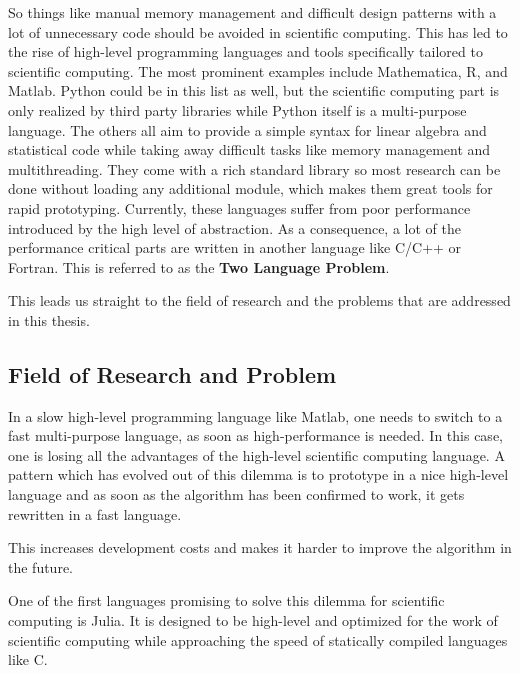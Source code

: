 So things like manual memory management and difficult design patterns with a lot of unnecessary code should be avoided in scientific computing.
This has led to the rise of high-level programming languages and tools specifically tailored to scientific computing\cite{DBLP:journals/corr/abs-1209-5145}.
The most prominent examples include Mathematica, R, and Matlab. 
Python could be in this list as well, but the scientific computing part is only realized by third party libraries while Python itself is a multi-purpose language.
The others all aim to provide a simple syntax for linear algebra and statistical code while taking away difficult tasks like memory management and multithreading. 
They come with a rich standard library so most research can be done without loading any additional module, which makes them great tools for rapid prototyping.
Currently, these languages suffer from poor performance introduced by the high level of abstraction.
As a consequence, a lot of the performance critical parts are written in another language like C/C++ or Fortran.
This is referred to as the \textbf{Two Language Problem}\cite{ArrayMultiJeff}.

This leads us straight to the field of research and the problems that are addressed in this thesis.


\subsection{Field of Research and Problem}

In a slow high-level programming language like Matlab, one needs to switch to a fast multi-purpose language, as soon as high-performance is needed.
In this case, one is losing all the advantages of the high-level scientific computing language.
A pattern which has evolved out of this dilemma is to prototype in a nice high-level language and as soon as the algorithm has been confirmed to work, it gets rewritten in a fast language.

This increases development costs and makes it harder to improve the algorithm in the future.

One of the first languages promising to solve this dilemma for scientific computing is Julia\cite{DBLP:journals/corr/BezansonEKS14}. 
It is designed to be high-level and optimized for the work of scientific computing while approaching the speed of statically compiled languages like C.


